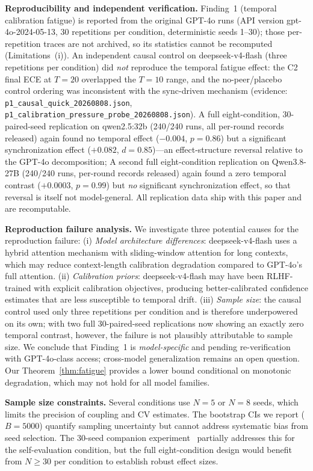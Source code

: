 \documentclass[11pt]{article}
\theoremstyle{definition}
\theoremstyle{remark}
\begin{document}
\textbf{Reproducibility and independent verification.} Finding~1 (temporal calibration fatigue) is reported from the original GPT-4o runs (API version gpt-4o-2024-05-13, 30 repetitions per condition, deterministic seeds 1--30); those per-repetition traces are not archived, so its statistics cannot be recomputed (Limitations~(i)). An independent causal control on deepseek-v4-flash (three repetitions per condition) did \textit{not} reproduce the temporal fatigue effect: the C2 final ECE at $T{=}20$ overlapped the $T{=}10$ range, and the no-peer/placebo control ordering was inconsistent with the sync-driven mechanism (evidence: \texttt{p1\_causal\_quick\_20260808.json}, \texttt{p1\_calibration\_pressure\_probe\_20260808.json}). A full eight-condition, 30-paired-seed replication on qwen2.5:32b (240/240 runs, all per-round records released) again found no temporal effect ($-0.004$, $p = 0.86$) but a significant synchronization effect ($+0.082$, $d = 0.85$)---an effect-structure reversal relative to the GPT-4o decomposition; A second full eight-condition replication on Qwen3.8-27B (240/240 runs, per-round records released) again found a zero temporal contrast ($+0.0003$, $p = 0.99$) but \emph{no} significant synchronization effect, so that reversal is itself not model-general. All replication data ship with this paper and are recomputable.

\textbf{Reproduction failure analysis.} We investigate three potential causes for the reproduction failure: (i) \textit{Model architecture differences}: deepseek-v4-flash uses a hybrid attention mechanism with sliding-window attention for long contexts, which may reduce context-length calibration degradation compared to GPT-4o's full attention. (ii) \textit{Calibration priors}: deepseek-v4-flash may have been RLHF-trained with explicit calibration objectives, producing better-calibrated confidence estimates that are less susceptible to temporal drift. (iii) \textit{Sample size}: the causal control used only three repetitions per condition and is therefore underpowered on its own; with two full 30-paired-seed replications now showing an exactly zero temporal contrast, however, the failure is not plausibly attributable to sample size. We conclude that Finding~1 is \textit{model-specific} and pending re-verification with GPT-4o-class access; cross-model generalization remains an open question. Our Theorem~\ref{thm:fatigue} provides a lower bound conditional on monotonic degradation, which may not hold for all model families.

\textbf{Sample size constraints.} Several conditions use $N{=}5$ or $N{=}8$ seeds, which limits the precision of coupling and CV estimates. The bootstrap CIs we report ($B{=}5000$) quantify sampling uncertainty but cannot address systematic bias from seed selection. The 30-seed companion experiment~\citep{companion2026} partially addresses this for the self-evaluation condition, but the full eight-condition design would benefit from $N{\geq}30$ per condition to establish robust effect sizes.
\end{document}
